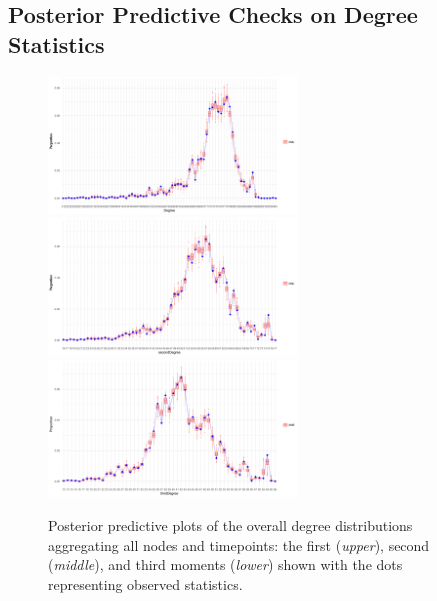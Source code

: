 \documentclass[a4paper]{article}
\begin{document}
\begin{appendices}
\section{Posterior Predictive Checks on Degree Statistics}\label{appendix: PPC}
\begin{figure}[H]
	\begin{center}
		\includegraphics[width=0.59\textwidth]{plots_paper/AMEoveralldegree-1.png}	
			\includegraphics[width=0.59\textwidth]{plots_paper/AMEoverallsecond-1.png}
				\includegraphics[width=0.59\textwidth]{plots_paper/AMEoverallthird-1.png}	
	\end{center}
		\caption {Posterior predictive plots of the overall degree distributions aggregating all nodes and timepoints: the first (\textit{upper}), second (\textit{middle}), and third moments (\textit{lower}) shown with the dots representing observed statistics.}
		\label{figure:PPC}
\end{figure}


\end{appendices}
\end{document}
